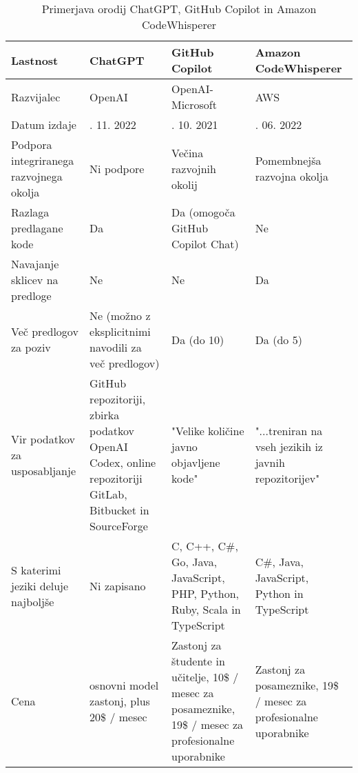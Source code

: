 \documentclass[12pt,a4paper]{book}
\begin{document}
\begin{table}[H]
\centering
\caption{Primerjava orodij ChatGPT, GitHub Copilot in Amazon CodeWhisperer}
\begin{tabular}{|>{\raggedright\arraybackslash}p{3cm}|>{\raggedright\arraybackslash}p{4cm}|>{\raggedright\arraybackslash}p{4cm}|>{\raggedright\arraybackslash}p{4cm}|}
\hline
\textbf{Lastnost}               & \textbf{ChatGPT}           & \textbf{GitHub Copilot}           & \textbf{Amazon CodeWhisperer}          
\\ \hline
Razvijalec              & OpenAI      & OpenAI-Microsoft                  & AWS            \\ \hline
Datum izdaje               & 30. 11. 2022        & 29. 10. 2021           & 23. 06. 2022       \\ \hline
Podpora integriranega razvojnega okolja           & Ni podpore          & Večina razvojnih okolij        & Pomembnejša razvojna okolja          \\ \hline
Razlaga predlagane kode       & Da                       & Da (omogoča GitHub Copilot Chat)                           & Ne                       \\ \hline
Navajanje sklicev na predloge                  & Ne                      & Ne                    & Da                      \\ \hline
Več predlogov za poziv                & Ne (možno z eksplicitnimi navodili za več predlogov)         & Da (do 10)                  & Da (do 5)               \\ \hline
Vir podatkov za usposabljanje             & GitHub repozitoriji, zbirka podatkov OpenAI Codex, online repozitoriji GitLab, Bitbucket in SourceForge                   & "Velike količine javno objavljene kode"                  & "...treniran na vseh jezikih iz javnih repozitorijev"                    \\ \hline
S katerimi jeziki deluje najboljše                        & Ni zapisano                  & C, C++, C\#, Go, Java, JavaScript, PHP, Python, Ruby, Scala in TypeScript              & C\#, Java, JavaScript, Python in TypeScript  \\ \hline
Cena               & osnovni model zastonj, plus 20\$ / mesec          & Zastonj za študente in učitelje, 10\$ / mesec za posameznike, 19\$ / mesec za profesionalne uporabnike                    &   Zastonj za posameznike, 19\$ / mesec za profesionalne uporabnike            \\ \hline
\end{tabular}
\label{tab:comparison}
\end{table}
\end{document}
